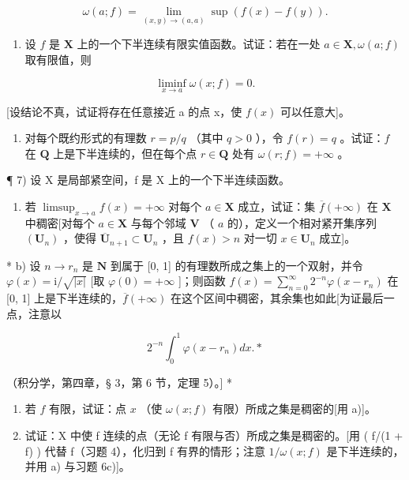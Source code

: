 \[
\omega (a; f) = \lim _ {(x, y) \rightarrow (a, a)} \sup (f (x) - f (y)).
\]

\begin{enumerate}
\def\labelenumi{\alph{enumi})}
\setcounter{enumi}{2}
\tightlist
\item
设 \(f\) 是 \(\mathbf{X}\) 上的一个下半连续有限实值函数。试证：若在一处 \(a \in \mathbf{X}, \omega(a; f)\) 取有限值，则
\end{enumerate}

\[
\liminf _ {x \to a} \omega (x; f) = 0.
\]

{[}设结论不真，试证将存在任意接近 a 的点 x，使 \(f(x)\) 可以任意大{]}。

\begin{enumerate}
\def\labelenumi{\alph{enumi})}
\setcounter{enumi}{3}
\tightlist
\item
对每个既约形式的有理数 \(r = p / q\) （其中 \(q > 0\) ），令 \(f(r) = q\) 。试证：\(f\) 在 \(\mathbf{Q}\) 上是下半连续的，但在每个点 \(r \in \mathbf{Q}\) 处有 \(\omega(r; f) = +\infty\) 。
\end{enumerate}

¶ 7) 设 X 是局部紧空间，f 是 X 上的一个下半连续函数。

\begin{enumerate}
\def\labelenumi{\alph{enumi})}
\tightlist
\item
若 \(\limsup_{x\to a}f(x)=+\infty\) 对每个 \(a\in\mathbf{X}\) 成立，试证：集 \(\overline{f}(+\infty)\) 在 \(\mathbf{X}\) 中稠密{[}对每个 \(a\in\mathbf{X}\) 与每个邻域 \(\mathbf{V}\) （ \(a\) 的），定义一个相对紧开集序列 \((\mathbf{U}_{n})\) ，使得 \(\overline{\mathbf{U}}_{n+1}\subset\mathbf{U}_{n}\) ，且 \(f(x)>n\) 对一切 \(x\in\mathbf{U}_{n}\) 成立{]}。
\end{enumerate}

* b) 设 \(n \to r_n\) 是 \(\mathbf{N}\) 到属于 {[}0, 1{]} 的有理数所成之集上的一个双射，并令 \(\varphi(x) = \mathrm{i}/\sqrt{|x|}\) {[}取 \(\varphi(0) = +\infty\) {]}；则函数 \(f(x) = \sum_{n=0}^{\infty} 2^{-n} \varphi(x - r_n)\) 在 {[}0, 1{]} 上是下半连续的，\(\overline{f}(+\infty)\) 在这个区间中稠密，其余集也如此{[}为证最后一点，注意以

\[
2 ^ {- n} \int_ {0} ^ {1} \varphi (x - r _ {n}) d x. *
\]

（积分学，第四章，§ 3，第 6 节，定理 5）。{]} *

\begin{enumerate}
\def\labelenumi{\alph{enumi})}
\setcounter{enumi}{2}
\item
若 \(f\) 有限，试证：点 \(x\) （使 \(\omega(x; f)\) 有限）所成之集是稠密的{[}用 a){]}。
\item
试证：X 中使 f 连续的点（无论 f 有限与否）所成之集是稠密的。{[}用 ( f/(1 + \textbar f\textbar) ) 代替 f（习题 4），化归到 f 有界的情形；注意 \(1/\omega(x; f)\) 是下半连续的，并用 a) 与习题 6c){]}。
\end{enumerate}

